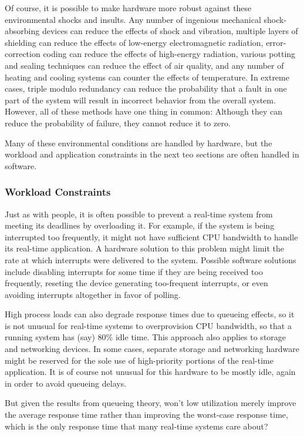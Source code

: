 Of course, it is possible to make hardware more robust against these
environmental shocks and insults.
Any number of ingenious mechanical shock-absorbing devices can reduce the
effects of shock and vibration, multiple layers of shielding can reduce
the effects of low-energy electromagnetic radiation, error-correction
coding can reduce the effects of high-energy radiation, various potting
and sealing techniques can reduce the effect of air quality, and any
number of heating and cooling systems can counter the effects of temperature.
In extreme cases, triple modulo redundancy can reduce the probability that
a fault in one part of the system will result in incorrect behavior from
the overall system.
However, all of these methods have one thing in common:  Although they
can reduce the probability of failure, they cannot reduce it to zero.

Many of these environmental conditions are handled by hardware, but the
workload and application constraints in the next teo sections are often
handled in software.

\subsubsection{Workload Constraints}
\label{sec:rt:Workload Constraints}

Just as with people, it is often possible to prevent a real-time system
from meeting its deadlines by overloading it.
For example, if the system is being interrupted too frequently, it might
not have sufficient CPU bandwidth to handle its real-time application.
A hardware solution to this problem might limit the rate at which
interrupts were delivered to the system.
Possible software solutions include disabling interrupts for some time if
they are being received too frequently,
reseting the device generating too-frequent interrupts,
or even avoiding interrupts altogether in favor of polling.

High process loads can also degrade response times due to queueing effects,
so it is not unusual for real-time systems to overprovision CPU bandwidth,
so that a running system has (say) 80\% idle time.
This approach also applies to storage and networking devices.
In some cases, separate storage and networking hardware might be reserved
for the sole use of high-priority portions of the real-time application.
It is of course not unusual for this hardware to be mostly idle, again
in order to avoid queueing delays.

\QuickQuiz{}
	But given the results from queueing theory, won't low utilization
	merely improve the average response time rather than improving
	the worst-case response time, which is the only response time
	that many real-time systems care about?
 \QuickQuizEnd

